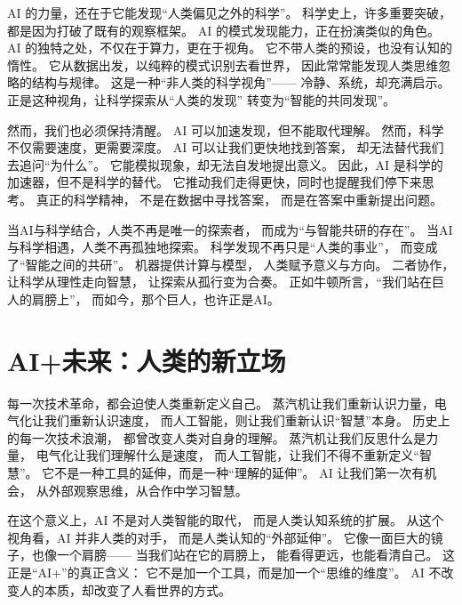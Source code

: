 AI 的力量，还在于它能发现“人类偏见之外的科学”。  
科学史上，许多重要突破，都是因为打破了既有的观察框架。  
AI 的模式发现能力，正在扮演类似的角色。  
AI 的独特之处，不仅在于算力，更在于视角。  
它不带人类的预设，也没有认知的惰性。  
它从数据出发，以纯粹的模式识别去看世界，  
因此常常能发现人类思维忽略的结构与规律。  
这是一种“非人类的科学视角”——  
冷静、系统，却充满启示。  
正是这种视角，让科学探索从“人类的发现”  
转变为“智能的共同发现”。

然而，我们也必须保持清醒。  
AI 可以加速发现，但不能取代理解。  
然而，科学不仅需要速度，更需要深度。  
AI 可以让我们更快地找到答案，  
却无法替代我们去追问“为什么”。  
它能模拟现象，却无法自发地提出意义。  
因此，AI 是科学的加速器，但不是科学的替代。  
它推动我们走得更快，同时也提醒我们停下来思考。  
真正的科学精神，  
不是在数据中寻找答案，  
而是在答案中重新提出问题。

当AI与科学结合，人类不再是唯一的探索者，  
而成为“与智能共研的存在”。  
当AI与科学相遇，人类不再孤独地探索。  
科学发现不再只是“人类的事业”，  
而变成了“智能之间的共研”。  
机器提供计算与模型，  
人类赋予意义与方向。  
二者协作，让科学从理性走向智慧，  
让探索从孤行变为合奏。  
正如牛顿所言，“我们站在巨人的肩膀上”，  
而如今，那个巨人，也许正是AI。



\section{AI+未来：人类的新立场}

每一次技术革命，都会迫使人类重新定义自己。  
蒸汽机让我们重新认识力量，电气化让我们重新认识速度，  
而人工智能，则让我们重新认识“智慧”本身。  
历史上的每一次技术浪潮，  
都曾改变人类对自身的理解。  
蒸汽机让我们反思什么是力量，  
电气化让我们理解什么是速度，  
而人工智能，让我们不得不重新定义“智慧”。  
它不是一种工具的延伸，而是一种“理解的延伸”。  
AI 让我们第一次有机会，  
从外部观察思维，从合作中学习智慧。

在这个意义上，AI 不是对人类智能的取代，  
而是人类认知系统的扩展。  
从这个视角看，AI 并非人类的对手，  
而是人类认知的“外部延伸”。  
它像一面巨大的镜子，也像一个肩膀——  
当我们站在它的肩膀上，  
能看得更远，也能看清自己。  
这正是“AI+”的真正含义：  
它不是加一个工具，而是加一个“思维的维度”。  
AI 不改变人的本质，却改变了人看世界的方式。

